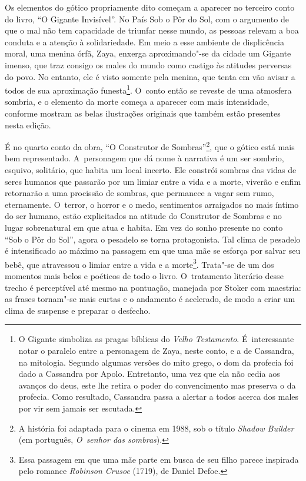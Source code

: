 Os elementos do gótico propriamente dito começam a aparecer no terceiro
conto do livro, ``O Gigante Invisível''. No País Sob o Pôr do Sol, com o
argumento de que o mal não tem capacidade de triunfar nesse mundo, as
pessoas relevam a boa conduta e a atenção à solidariedade. Em meio a
esse ambiente de displicência moral, uma menina órfã, Zaya, enxerga
aproximando"-se da cidade um Gigante imenso, que traz consigo os males do
mundo como castigo às atitudes perversas do povo. No entanto, ele é
visto somente pela menina, que tenta em vão avisar a todos de sua
aproximação funesta\footnote{O Gigante simboliza as pragas bíblicas do
\emph{Velho Testamento}. É~interessante notar o paralelo entre a
personagem de Zaya, neste conto, e a de Cassandra, na mitologia. Segundo
algumas versões do mito grego, o dom da profecia foi dado a Cassandra
por Apolo. Entretanto, uma vez que ela não cedia aos avanços do deus,
este lhe retira o poder do convencimento mas preserva o da profecia.
Como resultado, Cassandra passa a alertar a todos acerca dos males por
vir sem jamais ser escutada.}. O~conto então se reveste de
uma atmosfera sombria, e o elemento da morte começa a aparecer com mais
intensidade, conforme mostram as belas ilustrações originais que também
estão presentes nesta edição.

É no quarto conto da obra, ``O Construtor de Sombras''\footnote{A história foi adaptada para o cinema em
1988, sob o título \emph{Shadow Builder} (em português, \emph{O~senhor
das sombras}).}, que o gótico está mais bem representado. A~personagem que dá nome à narrativa é um ser sombrio, esquivo, solitário,
que habita um local incerto. Ele constrói sombras das vidas de seres
humanos que passarão por um limiar entre a vida e a morte, viverão e
enfim retornarão a uma procissão de sombras, que permanece a vagar sem
rumo, eternamente. O~terror, o horror e o medo, sentimentos arraigados
no mais íntimo do ser humano, estão explicitados na atitude do
Construtor de Sombras e no lugar sobrenatural em que atua e habita. Em
vez do sonho presente no conto ``Sob o Pôr do Sol'', agora o pesadelo se
torna protagonista. Tal clima de pesadelo é intensificado ao máximo na
passagem em que uma mãe se esforça por salvar seu bebê, que atravessou o
limiar entre a vida e a morte\footnote{Essa passagem em que uma mãe parte em busca
de seu filho parece inspirada pelo romance \emph{Robinson Crusoe}
(1719), de Daniel Defoe.}. Trata"-se de um
dos momentos mais belos e poéticos de todo o livro. O~tratamento
literário desse trecho é perceptível até mesmo na pontuação, manejada
por Stoker com maestria: as frases tornam"-se mais curtas e o andamento é
acelerado, de modo a criar um clima de suspense e preparar o desfecho.

